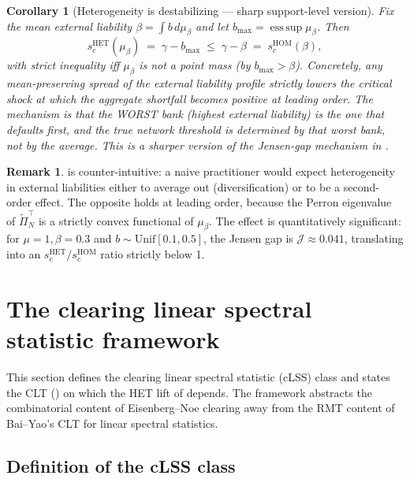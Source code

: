 \documentclass[11pt,a4paper]{article}
\newtheorem{corollary}[theorem]{Corollary}
\theoremstyle{definition}
\newtheorem{remark}[theorem]{Remark}
\newcommand{\HOM}{\mathrm{HOM}}
\newcommand{\HET}{\mathrm{HET}}
\begin{document}
\begin{corollary}[Heterogeneity is destabilizing --- sharp support-level version]
\label{cor:destab}
Fix the mean external liability $\beta = \int b\,d\mu_\beta$ and let
$b_{\max} = \operatorname{ess\,sup}\mu_\beta$. Then
\[
s_c^{\HET}(\mu_\beta)\;=\;\gamma - b_{\max}\;\leq\;\gamma - \beta\;=\;s_c^{\HOM}(\beta),
\]
with strict inequality iff $\mu_\beta$ is not a point mass (by $b_{\max}>\beta$).
Concretely, any mean-preserving spread of the external liability profile
\emph{strictly lowers} the critical shock at which the aggregate shortfall
becomes positive at leading order. The mechanism is that the WORST bank
(highest external liability) is the one that defaults first, and the true
network threshold is determined by that worst bank, not by the average.
This is a sharper version of the Jensen-gap mechanism in
.
\end{corollary}

\begin{remark}
 is counter-intuitive: a naive practitioner would expect
heterogeneity in external liabilities either to average out (diversification)
or to be a second-order effect. The opposite holds at leading order, because
the Perron eigenvalue of $\widetilde\Pi_N^\top$ is a strictly convex functional
of $\mu_\beta$. The effect is quantitatively significant: for
$\mu = 1,\beta = 0.3$ and $b\sim\mathrm{Unif}[0.1,0.5]$, the Jensen gap
is $\mathcal J\approx 0.041$, translating into an $s_c^{\HET}/s_c^{\HOM}$
ratio strictly below 1.
\end{remark}

\section{The clearing linear spectral statistic framework}
\label{sec:clss}

This section defines the clearing linear spectral statistic (cLSS) class and
states the CLT () on which the HET lift of
 depends. The framework abstracts the combinatorial content
of Eisenberg--Noe clearing away from the RMT content of Bai--Yao's CLT for
linear spectral statistics.

\subsection{Definition of the cLSS class}
\end{document}
